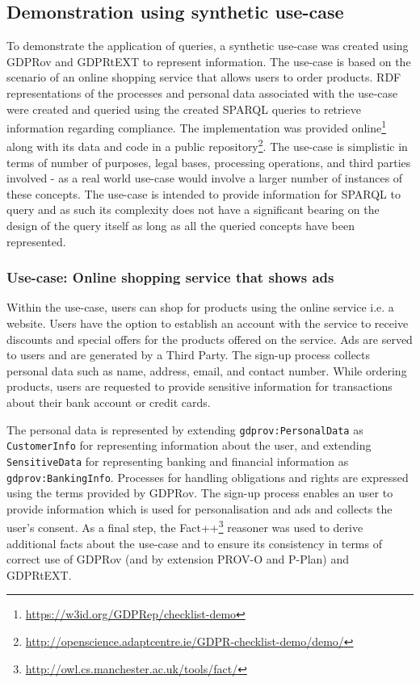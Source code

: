 \subsection{Demonstration using synthetic use-case} \label{sec:testing:sparql:demo}
To demonstrate the application of queries, a synthetic use-case was created using GDPRov and GDPRtEXT to represent information.
The use-case is based on the scenario of an online shopping service that allows users to order products.
RDF representations of the processes and personal data associated with the use-case were created and queried using the created SPARQL queries to retrieve information regarding compliance.
The implementation was provided online\footnote{\url{https://w3id.org/GDPRep/checklist-demo}} along with its data and code in a public repository\footnote{\url{http://openscience.adaptcentre.ie/GDPR-checklist-demo/demo/}}.
The use-case is simplistic in terms of number of purposes, legal bases, processing operations, and third parties involved - as a real world use-case would involve a larger number of instances of these concepts. The use-case is intended to provide information for SPARQL to query and as such its complexity does not have a significant bearing on the design of the query itself as long as all the queried concepts have been represented.

\subsubsection{Use-case: Online shopping service that shows ads}
Within the use-case, users can shop for products using the online service i.e. a website. Users have the option to establish an account with the service to receive discounts and special offers for the products offered on the service.
Ads are served to users and are generated by a Third Party.
The sign-up process collects personal data such as name, address, email, and contact number.
While ordering products, users are requested to provide sensitive information for transactions about their bank account or credit cards.

The personal data is represented by extending \texttt{gdprov:PersonalData} as \texttt{CustomerInfo} for representing information about the user, and extending \texttt{SensitiveData} for representing banking and financial information as \texttt{gdprov:BankingInfo}.
Processes for handling obligations and rights are expressed using the terms provided by GDPRov.
The sign-up process enables an user to provide information which is used for personalisation and ads and collects the user's consent.
As a final step, the Fact++\footnote{\url{http://owl.cs.manchester.ac.uk/tools/fact/}}
reasoner was used to derive additional facts about the use-case and to ensure its consistency in terms of correct use of GDPRov (and by extension PROV-O and P-Plan) and GDPRtEXT.

